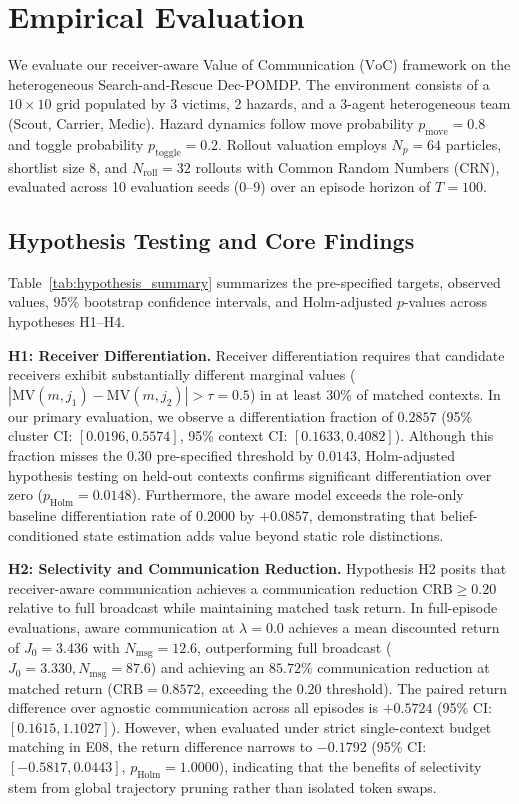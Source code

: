 \section{Empirical Evaluation}
\label{sec:results}

We evaluate our receiver-aware Value of Communication ($\mathrm{VoC}$) framework on the heterogeneous Search-and-Rescue Dec-POMDP. The environment consists of a $10\times 10$ grid populated by 3 victims, 2 hazards, and a 3-agent heterogeneous team (Scout, Carrier, Medic). Hazard dynamics follow move probability $p_{\mathrm{move}}=0.8$ and toggle probability $p_{\mathrm{toggle}}=0.2$. Rollout valuation employs $N_p=64$ particles, shortlist size 8, and $N_{\mathrm{roll}}=32$ rollouts with Common Random Numbers (CRN), evaluated across 10 evaluation seeds (0--9) over an episode horizon of $T=100$.

\subsection{Hypothesis Testing and Core Findings}
Table~\ref{tab:hypothesis_summary} summarizes the pre-specified targets, observed values, 95\% bootstrap confidence intervals, and Holm-adjusted $p$-values across hypotheses H1--H4.

\textbf{H1: Receiver Differentiation.} Receiver differentiation requires that candidate receivers exhibit substantially different marginal values ($|\mathrm{MV}(m, j_1) - \mathrm{MV}(m, j_2)| > \tau = 0.5$) in at least 30\% of matched contexts. In our primary evaluation, we observe a differentiation fraction of $0.2857$ (95\% cluster CI: $[0.0196, 0.5574]$, 95\% context CI: $[0.1633, 0.4082]$). Although this fraction misses the $0.30$ pre-specified threshold by $0.0143$, Holm-adjusted hypothesis testing on held-out contexts confirms significant differentiation over zero ($p_{\mathrm{Holm}} = 0.0148$). Furthermore, the aware model exceeds the role-only baseline differentiation rate of $0.2000$ by $+0.0857$, demonstrating that belief-conditioned state estimation adds value beyond static role distinctions.

\textbf{H2: Selectivity and Communication Reduction.} Hypothesis H2 posits that receiver-aware communication achieves a communication reduction $\mathrm{CRB} \ge 0.20$ relative to full broadcast while maintaining matched task return. In full-episode evaluations, aware communication at $\lambda=0.0$ achieves a mean discounted return of $J_0 = 3.436$ with $N_{\mathrm{msg}} = 12.6$, outperforming full broadcast ($J_0 = 3.330, N_{\mathrm{msg}} = 87.6$) and achieving an $85.72\%$ communication reduction at matched return ($\mathrm{CRB} = 0.8572$, exceeding the $0.20$ threshold). The paired return difference over agnostic communication across all episodes is $+0.5724$ (95\% CI: $[0.1615, 1.1027]$). However, when evaluated under strict single-context budget matching in E08, the return difference narrows to $-0.1792$ (95\% CI: $[-0.5817, 0.0443]$, $p_{\mathrm{Holm}} = 1.0000$), indicating that the benefits of selectivity stem from global trajectory pruning rather than isolated token swaps.

